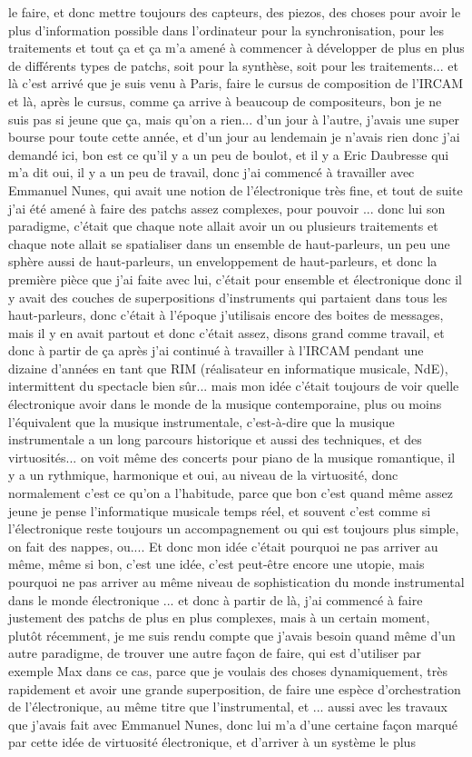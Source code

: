 le faire, et donc mettre toujours des capteurs, des piezos, des choses pour avoir le plus d'information possible dans l'ordinateur pour la synchronisation, pour les traitements et tout ça et ça m'a amené à commencer à développer de plus en plus de différents types de patchs, soit pour la synthèse, soit pour les traitements... et là c'est arrivé que je suis venu à Paris, faire le cursus de composition de l'IRCAM et là, après le cursus, comme ça arrive à beaucoup de compositeurs, bon je ne suis pas si jeune que ça, mais qu'on a rien... d'un jour à l'autre, j'avais une super bourse pour toute cette année, et d'un jour au lendemain je n'avais rien donc j'ai demandé ici, bon est ce qu'il y a un peu de boulot, et il y a Eric Daubresse qui m'a dit oui, il y a un peu de travail, donc j'ai commencé à travailler avec Emmanuel Nunes, qui avait une notion de l'électronique très fine, et tout de suite j'ai été amené à faire des patchs assez complexes, pour pouvoir ... donc lui son paradigme, c'était que chaque note allait avoir un ou plusieurs traitements et chaque note allait se spatialiser dans un ensemble de haut-parleurs, un peu une sphère aussi de haut-parleurs, un enveloppement de haut-parleurs, et donc la première pièce que j'ai faite avec lui, c'était pour ensemble et électronique donc il y avait des couches de superpositions d'instruments qui partaient dans tous les haut-parleurs, donc c'était à l'époque j'utilisais encore des boites de messages, mais il y en avait partout et donc c'était assez, disons grand comme travail, et donc à partir de ça après j'ai continué à travailler à l'IRCAM pendant une dizaine d'années en tant que RIM (réalisateur en informatique musicale, NdE), intermittent du spectacle bien sûr... mais mon idée c'était toujours de voir quelle électronique avoir dans le monde de la musique contemporaine, plus ou moins l'équivalent que la musique instrumentale, c'est-à-dire que la musique instrumentale a un long parcours historique et aussi des techniques, et des virtuosités... on voit même des concerts pour piano de la musique romantique, il y a un rythmique, harmonique et oui, au niveau de la virtuosité, donc normalement c'est ce qu'on a l'habitude, parce que bon c'est quand même assez jeune je pense l'informatique musicale temps réel, et souvent c'est comme si l'électronique reste toujours un accompagnement ou qui est toujours plus simple, on fait des nappes, ou.... Et donc mon idée c'était pourquoi ne pas arriver au même, même si bon, c'est une idée, c'est peut-être encore une utopie, mais pourquoi ne pas arriver au même niveau de sophistication du monde instrumental dans le monde électronique ... et donc à partir de là, j'ai commencé à faire justement des patchs de plus en plus complexes, mais à un certain moment, plutôt récemment, je me suis rendu compte que j'avais besoin quand même d'un autre paradigme, de trouver une autre façon de faire, qui est d'utiliser par exemple Max dans ce cas, parce que je voulais des choses dynamiquement, très rapidement et avoir une grande superposition, de faire une espèce d'orchestration de l'électronique, au même titre que l'instrumental, et ... aussi avec les travaux que j'avais fait avec Emmanuel Nunes, donc lui m'a d'une certaine façon marqué par cette idée de virtuosité électronique, et d'arriver à un système le plus 